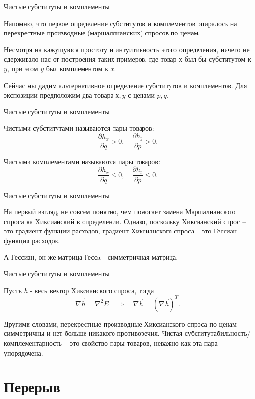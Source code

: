 \documentclass{beamer}
\begin{document}
\begin{frame}{Чистые субституты и комплементы}

Напомню, что первое определение субститутов и комплементов опиралось на перекрестные производные (маршаллианских) спросов по ценам. 

Несмотря на кажущуюся простоту и интуитивность этого определения, ничего не сдерживало нас от построения таких примеров, где товар $х$ был бы субститутом к $y$, при этом $y$ был комплементом к $x$.

Сейчас мы дадим альтернативное определение субститутов и комплементов. Для экспозиции предположим два товара $х,y$ с ценами $p,q$.
\end{frame}

\begin{frame}{Чистые субституты и комплементы}

\begin{definition}
Чистыми субститутами называются пары товаров:
$$
\frac{\partial h_x}{\partial q} > 0, \quad \frac{\partial h_y}{\partial p} > 0.
$$

Чистыми комплементами называются пары товаров: 
$$
\frac{\partial h_x}{\partial q} \leqslant 0, \quad \frac{\partial h_y}{\partial p} \leqslant 0.
$$
\end{definition}

\end{frame}

\begin{frame}{Чистые субституты и комплементы}

На первый взгляд, не совсем понятно, чем помогает замена Маршалианского спроса на Хиксианский в определении. Однако, поскольку Хиксианский спрос – это градиент функции расходов, градиент Хиксианского спроса – это Гессиан функции расходов. 

А Гессиан, он же матрица Гессa - симметричная матрица.

\end{frame}

\begin{frame}{Чистые субституты и комплементы}

\begin{lemma}
Пусть $h$ - весь вектор Хиксианского спроса, тогда
$$ \nabla \vec h = \nabla^2 E \quad \Rightarrow \quad \nabla \vec h = (\nabla \vec h)^T.$$
\end{lemma}

Другими словами, перекрестные производные Хиксианского спроса по ценам - симметричны и нет больше никакого противоречия. Чистая субститутабильность/комплементарность – это свойство пары товаров, неважно как эта пара упорядочена.

\end{frame}

\section{Перерыв}
\end{document}
